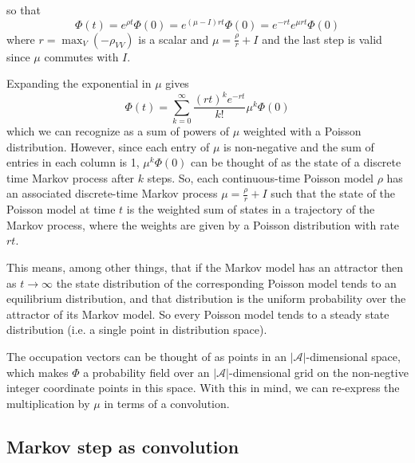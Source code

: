 \documentclass[a4paper]{article}
\begin{document}
so that
\[
\Phi(t) = e^{\rho t}\Phi(0) = e^{(\mu - I)rt}\Phi(0) = e^{-rt}e^{\mu rt}\Phi(0)
\]
where $r = \max_V(-\rho_{VV})$ is a scalar and $\mu = \frac{\rho}{r} + I$ and the last step is valid since $\mu$ commutes with $I$.

Expanding the exponential in $\mu$ gives
\[
\Phi(t)  = \sum_{k=0}^\infty \frac{ (rt)^k e^{-rt}}{k!}\mu^k\Phi(0)
\]
which we can recognize as a sum of powers of $\mu$ weighted with a Poisson distribution. However, since each entry of $\mu$ is non-negative and the sum of entries in each column is 1, $\mu^k \Phi(0)$ can be thought of as the state of a discrete time Markov process after $k$ steps. So, each continuous-time Poisson model $\rho$ has an associated discrete-time Markov process $\mu = \frac{\rho}{r} + I$ such that the state of the Poisson model at time $t$ is the weighted sum of states in a trajectory of the Markov process, where the weights are given by a Poisson distribution with rate $rt$.

This means, among other things, that if the Markov model has an attractor then as $t \to \infty$ the state distribution of the corresponding Poisson model tends to an equilibrium distribution, and that distribution is the uniform probability over the attractor of its Markov model. So every Poisson model tends to a steady state distribution (i.e. a single point in distribution space).

The occupation vectors can be thought of as points in an $|\mathcal{A}|$-dimensional space, which makes $\Phi$ a probability field over an $|\mathcal{A}|$-dimensional grid on the non-negtive integer coordinate points in this space. With this in mind, we can re-express the multiplication by $\mu$ in terms of a convolution.

\subsection{Markov step as convolution}
\end{document}
